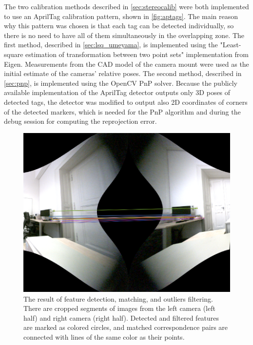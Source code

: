The two calibration methods described in \autoref{sec:stereocalib} were both implemented to use an AprilTag calibration pattern, shown in \autoref{fig:aptags}.
The main reason why this pattern was chosen is that each tag can be detected individually, so there is no need to have all of them simultaneously in the overlapping zone.
The first method, described in \autoref{sec:lsq_umeyama}, is implemented using the "Least-square estimation of transformation between two point sets" \cite{Umeyama1991} implementation from Eigen.
Measurements from the CAD model of the camera mount were used as the initial estimate of the cameras' relative poses.
The second method, described in \autoref{sec:pnp}, is implemented using the OpenCV PnP solver.
Because the publicly available implementation of the AprilTag detector outputs only 3D poses of detected tags, the detector was modified to output also 2D coordinates of corners of the detected markers, which is needed for the PnP algorithm and during the debug session for computing the reprojection error.

\begin{figure}[ht]
  \centering
  \includegraphics[width=1\textwidth]{graphics/corresp.png}
  \caption[The result of features detection, matching, and outliers filtering.]{The result of feature detection, matching, and outliers filtering. There are cropped segments of images from the left camera (left half) and right camera (right half). Detected and filtered features are marked as colored circles, and matched correspondence pairs are connected with lines of the same color as their points.}
  \label{fig:corresp_life}
\end{figure}

